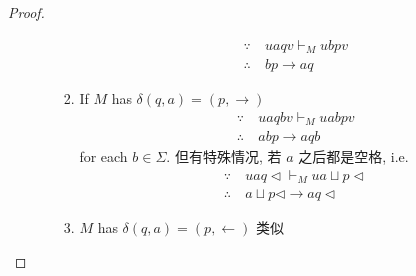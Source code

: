 \begin{proof}
\begin{itemize}
\begin{itemize}
\begin{enumerate}
                \begin{align*}
                    \because\ & uaqv\vdash_M ubpv\\
                    \therefore\ & bp\to aq
                \end{align*}
                \item If $M$ has $\delta(q, a)=(p, \rightarrow)$
                \begin{align*}
                    \because\ & uaqbv\vdash_M uabpv\\
                    \therefore\ & abp\to aqb
                \end{align*}
                for each $b\in \Sigma$.
                \subitem 但有特殊情况, 若 $a$ 之后都是空格, i.e.
                \begin{align*}
                    \because\ & uaq\triangleleft\vdash_M ua\sqcup p\triangleleft\\
                    \therefore\ & a\sqcup p\triangleleft\to aq\triangleleft
                \end{align*}
                \item $M$ has $\delta(q, a)=(p, \leftarrow)$ 类似
            \end{enumerate}
        \end{itemize}
    \end{itemize}
\end{proof}

